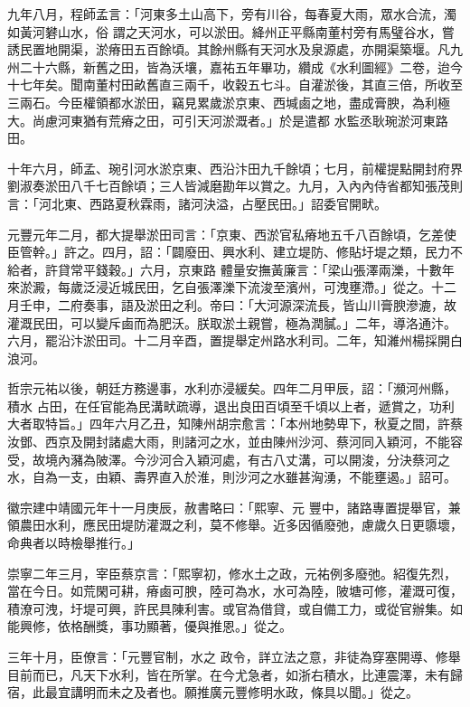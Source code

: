 \begin{pinyinscope}
 九年八月，程師孟言：「河東多土山高下，旁有川谷，每春夏大雨，眾水合流，濁如黃河礬山水，俗
 謂之天河水，可以淤田。絳州正平縣南董村旁有馬璧谷水，嘗誘民置地開渠，淤瘠田五百餘頃。其餘州縣有天河水及泉源處，亦開渠築堰。凡九州二十六縣，新舊之田，皆為沃壤，嘉祐五年畢功，纘成《水利圖經》二卷，迨今十七年矣。聞南董村田畝舊直三兩千，收穀五七斗。自灌淤後，其直三倍，所收至三兩石。今臣權領都水淤田，竊見累歲淤京東、西堿鹵之地，盡成膏腴，為利極大。尚慮河東猶有荒瘠之田，可引天河淤溉者。」於是遣都
 水監丞耿琬淤河東路田。



 十年六月，師孟、琬引河水淤京東、西沿汴田九千餘頃；七月，前權提點開封府界劉淑奏淤田八千七百餘頃；三人皆減磨勘年以賞之。九月，入內內侍省都知張茂則言：「河北東、西路夏秋霖雨，諸河決溢，占壓民田。」詔委官開畎。



 元豐元年二月，都大提舉淤田司言：「京東、西淤官私瘠地五千八百餘頃，乞差使臣管幹。」許之。四月，詔：「闢廢田、興水利、建立堤防、修貼圩堤之類，民力不給者，許貸常平錢穀。」六月，京東路
 體量安撫黃廉言：「梁山張澤兩濼，十數年來淤澱，每歲泛浸近城民田，乞自張澤濼下流浚至濱州，可洩壅滯。」從之。十二月壬申，二府奏事，語及淤田之利。帝曰：「大河源深流長，皆山川膏腴滲漉，故灌溉民田，可以變斥鹵而為肥沃。朕取淤土親嘗，極為潤膩。」二年，導洛通汴。六月，罷沿汴淤田司。十二月辛酉，置提舉定州路水利司。二年，知濰州楊採開白浪河。



 哲宗元祐以後，朝廷方務邊事，水利亦浸緩矣。四年二月甲辰，詔：「瀕河州縣，積水
 占田，在任官能為民溝畎疏導，退出良田百頃至千頃以上者，遞賞之，功利大者取特旨。」四年六月乙丑，知陳州胡宗愈言：「本州地勢卑下，秋夏之間，許蔡汝鄧、西京及開封諸處大雨，則諸河之水，並由陳州沙河、蔡河同入穎河，不能容受，故境內瀦為陂澤。今沙河合入穎河處，有古八丈溝，可以開浚，分決蔡河之水，自為一支，由穎、壽界直入於淮，則沙河之水雖甚洶湧，不能壅遏。」詔可。



 徽宗建中靖國元年十一月庚辰，赦書略曰：「熙寧、元
 豐中，諸路專置提舉官，兼領農田水利，應民田堤防灌溉之利，莫不修舉。近多因循廢弛，慮歲久日更隳壞，命典者以時檢舉推行。」



 崇寧二年三月，宰臣蔡京言：「熙寧初，修水土之政，元祐例多廢弛。紹復先烈，當在今日。如荒閑可耕，瘠鹵可腴，陸可為水，水可為陸，陂塘可修，灌溉可復，積潦可洩，圩堤可興，許民具陳利害。或官為借貸，或自備工力，或從官辦集。如能興修，依格酬獎，事功顯著，優與推恩。」從之。



 三年十月，臣僚言：「元豐官制，水之
 政令，詳立法之意，非徒為穿塞開導、修舉目前而已，凡天下水利，皆在所掌。在今尤急者，如浙右積水，比連震澤，未有歸宿，此最宜講明而未之及者也。願推廣元豐修明水政，條具以聞。」從之。




\end{pinyinscope}
